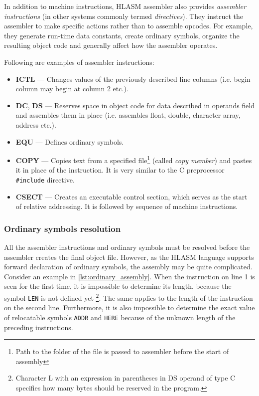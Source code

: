 In addition to machine instructions, HLASM assembler also provides \emph{assembler instructions} (in other systems commonly termed \emph{directives}). They instruct the assembler to make specific actions rather than to assemble opcodes. For example, they generate run-time data constants, create ordinary symbols, organize the resulting object code and generally affect how the assembler operates.

Following are examples of assembler instructions:
\begin{itemize}
	\item \textbf{ICTL} --- Changes values of the previously described line columns (i.e. begin column may begin at column 2 etc.).
	
	\item \textbf{DC}, \textbf{DS} --- Reserves space in object code for data described in operands field and assembles them in place (i.e. assembles float, double, character array, address etc.).
	
	\item \textbf{EQU} --- Defines ordinary symbols.
	
	\item \textbf{COPY} --- Copies text from a specified file\footnote{Path to the folder of the file is passed to assembler before the start of assembly} (called \emph{copy member}) and pastes it in place of the instruction. It is very similar to the C preprocessor \texttt{\#include} directive.
	
	\item \textbf{CSECT} --- Creates an executable control section, which serves as the start of relative addressing. It is followed by sequence of machine instructions.
\end{itemize}

\subsubsection{Ordinary symbols resolution}
\label{ordinary_resolution}
All the assembler instructions and ordinary symbols must be resolved before the assembler creates the final object file. However, as the HLASM language supports forward declaration of ordinary symbols, the assembly may be quite complicated. Consider an example in \cref{lst:ordinary_assembly}. When the instruction on line 1 is seen for the first time, it is impossible to determine its length, because the symbol \verb|LEN| is not defined yet \footnote{Character L with an expression in parentheses in DS operand of type C specifies how many bytes should be reserved in the program.}. The same applies to the length of the instruction on the second line. Furthermore, it is also impossible to determine the exact value of relocatable symbols \verb|ADDR| and \verb|HERE| because of the unknown length of the preceding instructions.

